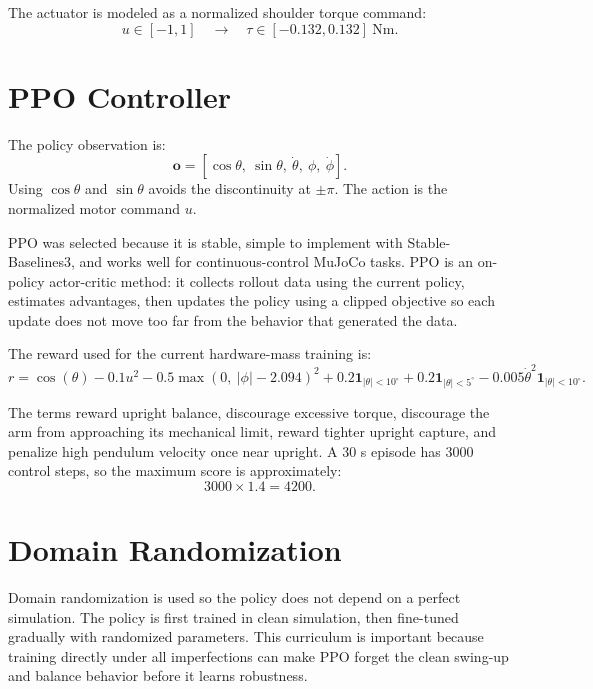 \documentclass[11pt,a4paper]{article}
\begin{document}
The actuator is modeled as a normalized shoulder torque command:
\[
u\in[-1,1] \quad \rightarrow \quad \tau\in[-0.132,0.132]\ \mathrm{Nm}.
\]

\section{PPO Controller}

The policy observation is:
\[
\mathbf{o}=[\cos\theta,\ \sin\theta,\ \dot{\theta},\ \phi,\ \dot{\phi}].
\]
Using $\cos\theta$ and $\sin\theta$ avoids the discontinuity at $\pm\pi$.
The action is the normalized motor command $u$.

PPO was selected because it is stable, simple to implement with
Stable-Baselines3, and works well for continuous-control MuJoCo tasks.  PPO is
an on-policy actor-critic method: it collects rollout data using the current
policy, estimates advantages, then updates the policy using a clipped objective
so each update does not move too far from the behavior that generated the data.

The reward used for the current hardware-mass training is:
\[
r=\cos(\theta)-0.1u^2
-0.5\max(0,\ |\phi|-2.094)^2
+0.2\mathbf{1}_{|\theta|<10^\circ}
+0.2\mathbf{1}_{|\theta|<5^\circ}
-0.005\dot{\theta}^2\mathbf{1}_{|\theta|<10^\circ}.
\]

The terms reward upright balance, discourage excessive torque, discourage the
arm from approaching its mechanical limit, reward tighter upright capture, and
penalize high pendulum velocity once near upright.  A 30 s episode has 3000
control steps, so the maximum score is approximately:
\[
3000\times1.4=4200.
\]

\section{Domain Randomization}

Domain randomization is used so the policy does not depend on a perfect
simulation.  The policy is first trained in clean simulation, then fine-tuned
gradually with randomized parameters.  This curriculum is important because
training directly under all imperfections can make PPO forget the clean swing-up
and balance behavior before it learns robustness.
\end{document}
